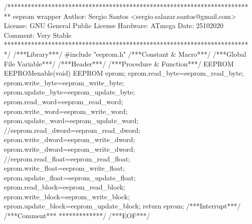 \begin{verbatimtab}
/*************************************************************************
eeprom wrapper
Author: Sergio Santos
<sergio.salazar.santos@gmail.com>
License: GNU General Public License
Hardware: ATmega
Date: 25102020
Comment:
Very Stable
*************************************************************************/
/***Library***/
#include "eeprom.h"
/***Constant & Macro***/
/***Global File Variable***/
/***Header***/
/***Procedure & Function***/
EEPROM EEPROMenable(void){
	EEPROM eprom;
	eprom.read_byte=eeprom_read_byte;
	eprom.write_byte=eeprom_write_byte;
	eprom.update_byte=eeprom_update_byte;
	eprom.read_word=eeprom_read_word;
	eprom.write_word=eeprom_write_word;
	eprom.update_word=eeprom_update_word;
	//eeprom.read_dword=eeprom_read_dword;
	eprom.write_dword=eeprom_write_dword;
	eprom.write_dword=eeprom_write_dword;
	//eeprom.read_float=eeprom_read_float;
	eprom.write_float=eeprom_write_float;
	eprom.update_float=eeprom_update_float;
	eprom.read_block=eeprom_read_block;
	eprom.write_block=eeprom_write_block;
	eprom.update_block=eeprom_update_block;
	return eprom;
}
/***Interrupt***/
/***Comment***
*************/
/***EOF***/
\end{verbatimtab}